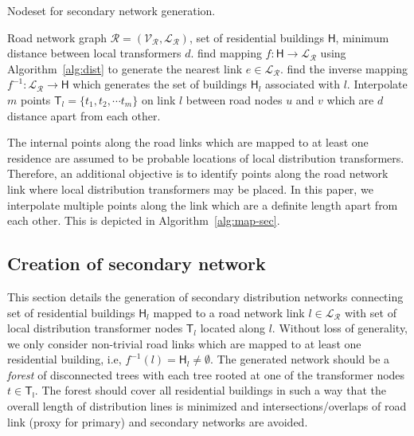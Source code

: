 \documentclass[sigconf]{acmart}
\begin{document}
\begin{algorithm}
	\caption{Nodeset for secondary network generation.}
	\label{alg:map-sec}
	\begin{algorithmic}[1]
		\REQUIRE Road network graph $\mathcal{R=(\mathcal{V_R},\mathcal{L_R})}$, set of residential buildings $\mathsf{H}$, minimum distance between local transformers $d$.
		\STATE find mapping $f:\mathsf{H}\rightarrow\mathcal{L_R}$ using Algorithm~\ref{alg:dist} to generate the nearest link $e\in\mathcal{L_R}$.
		\ENDFOR
		\STATE find the inverse mapping $f^{-1}:\mathcal{L_R}\rightarrow\mathsf{H}$ which generates the set of buildings $\mathsf{H}_l$ associated with $l$.
		\STATE Interpolate $m$ points $\mathsf{T}_l=\{t_1,t_2,\cdots t_m\}$ on link $l$ between road nodes $u$ and $v$ which are $d$ distance apart from each other.
		\ENDFOR
	\end{algorithmic}
\end{algorithm}
The internal points along the road links which are mapped to at least one residence are assumed to be probable locations of local distribution transformers. Therefore, an additional objective is to identify points along the road network link where local distribution transformers may be placed. In this paper, we interpolate multiple points along the link which are a definite length apart from each other. This is depicted in Algorithm~\ref{alg:map-sec}.

\subsection{Creation of secondary network}\label{ssec:sec-network}
This section details the generation of secondary distribution networks connecting set of residential buildings $\mathsf{H}_l$ mapped to a road network link $l\in\mathcal{L_R}$ with set of local distribution transformer nodes $\mathsf{T}_l$ located along $l$. Without loss of generality, we only consider non-trivial road links which are mapped to at least one residential building, i.e, $f^{-1}(l)=\mathsf{H}_l\neq\emptyset$. The generated network should be a \emph{forest} of disconnected trees with each tree rooted at one of the transformer nodes $t\in\mathsf{T_l}$. The forest should cover all residential buildings in such a way that the overall length of distribution lines is minimized and intersections/overlaps of road link (proxy for primary) and secondary networks are avoided.
\end{document}
